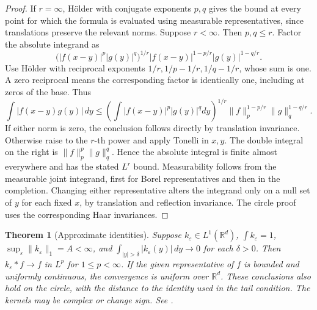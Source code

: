 \documentclass[11pt,oneside,openany]{book}
\newtheorem{theorem}{Theorem}[chapter]
\theoremstyle{definition}
\theoremstyle{remark}
\begin{document}
\begin{proof}
If \(r=\infty\), Hölder with conjugate exponents \(p,q\) gives the bound at every point for which the formula is evaluated using measurable representatives, since translations preserve the relevant norms. Suppose \(r<\infty\). Then \(p,q\le r\). Factor the absolute integrand as
\[
 \bigl(|f(x-y)|^{p}|g(y)|^q\bigr)^{1/r}
 |f(x-y)|^{1-p/r}|g(y)|^{1-q/r}.
\]
Use Hölder with reciprocal exponents \(1/r,1/p-1/r,1/q-1/r\), whose sum is one. A zero reciprocal means the corresponding factor is identically one, including at zeros of the base. Thus
\[
 \int |f(x-y)g(y)|\,dy\le
 \left(\int |f(x-y)|^p|g(y)|^qdy\right)^{1/r}
 \|f\|_p^{1-p/r}\|g\|_q^{1-q/r}.
\]
If either norm is zero, the conclusion follows directly by translation invariance. Otherwise raise to the \(r\)-th power and apply Tonelli in \(x,y\). The double integral on the right is \(\|f\|_p^p\|g\|_q^q\). Hence the absolute integral is finite almost everywhere and has the stated \(L^r\) bound. Measurability follows from the measurable joint integrand, first for Borel representatives and then in the completion. Changing either representative alters the integrand only on a null set of \(y\) for each fixed \(x\), by translation and reflection invariance. The circle proof uses the corresponding Haar invariances.
\end{proof}

\begin{theorem}[Approximate identities]
\label{p102:AN-06-C02-R02}
Suppose \(k_\varepsilon\in L^1(\mathbb R^d)\),
\(\int k_\varepsilon=1\), \(\sup_\varepsilon\|k_\varepsilon\|_1=A<\infty\), and
\(\int_{|y|>\delta}|k_\varepsilon(y)|\,dy\to0\) for each \(\delta>0\).
Then \(k_\varepsilon*f\to f\) in \(L^p\) for \(1\le p<\infty\). If the given representative of \(f\) is bounded and uniformly continuous, the convergence is uniform over \(\mathbb R^d\). These conclusions also hold on the circle, with the distance to the identity used in the tail condition. The kernels may be complex or change sign. See \cite[\S1.2.4]{grafakos}.
\end{theorem}
\end{document}
